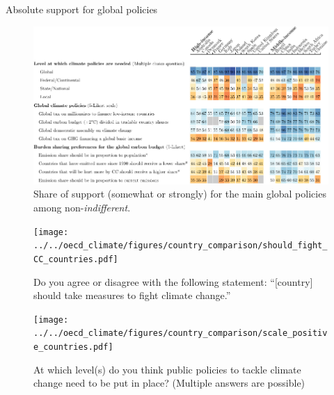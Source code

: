 \documentclass[aspectratio=169,xcolor=dvipsnames, 11pt,mathserif]{beamer}
\begin{document}
\begin{framefont}{\small}
\begin{frame}{Absolute support for global policies\label{absolute_oecd} \hyperlink{global_policies}{}} 
\begin{figure}[h!]
    \centering		
    \caption{Share of support (somewhat or strongly) for the main global policies among non-\textit{indifferent}.   }
    \vspace{-.2cm}
    \includegraphics[height=.82\textheight]{../figures/OECD/Heatplot_global_tax_attitudes_positive.pdf} %
    \end{figure}
\end{frame}

\begin{frame}{} %
	\begin{figure}[h!]
	\centering
	\caption{Do you agree or disagree with the following statement: ``[country] should take measures to fight climate change.'' \hyperlink{global_policies}{}
	}
	\texttt{[image: ../../oecd\_climate/figures/country\_comparison/should\_fight\_CC\_countries.pdf]}
	\end{figure}
\end{frame}

\begin{frame}{}%
	\begin{figure}[h!]
	\centering
	\caption{
		At which level(s) do you think public policies to tackle climate change need to be put in place? (Multiple answers are possible) \hyperlink{global_policies}{}
	}
	\texttt{[image: ../../oecd\_climate/figures/country\_comparison/scale\_positive\_countries.pdf]}
	\end{figure}
\end{frame}


\end{framefont}
\end{document}
